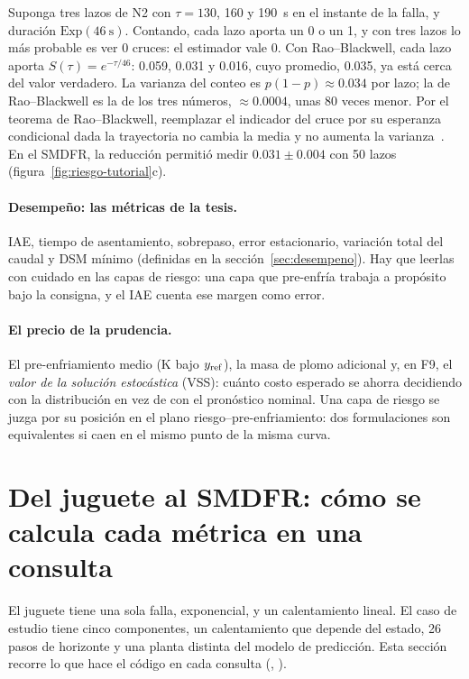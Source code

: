 \begin{ejemplo}\label{ej:rb}
Suponga tres lazos de N2 con $\tau=130$, 160 y 190~s en el instante de la falla, y duración
$\mathrm{Exp}(46~\text{s})$. Contando, cada lazo aporta un 0 o un 1, y con tres lazos lo más
probable es ver 0 cruces: el estimador vale 0. Con Rao--Blackwell, cada lazo aporta
$S(\tau)=e^{-\tau/46}$: 0.059, 0.031 y 0.016, cuyo promedio, 0.035, ya está cerca del valor
verdadero. La varianza del conteo es $p(1-p)\approx0.034$ por lazo; la de Rao--Blackwell es la
de los tres números, $\approx0.0004$, unas 80 veces menor. Por el teorema de Rao--Blackwell, reemplazar
el indicador del cruce por su esperanza condicional dada la trayectoria no cambia la media y no
aumenta la varianza~\cite{casella2002}. En el SMDFR, la reducción permitió medir
$0.031\pm0.004$ con 50 lazos (figura~\ref{fig:riesgo-tutorial}c).
\end{ejemplo}

\paragraph{Desempeño: las métricas de la tesis.} IAE, tiempo de asentamiento, sobrepaso,
error estacionario, variación total del caudal y DSM mínimo (definidas en la
sección~\ref{sec:desempeno}). Hay que leerlas con cuidado en las capas de riesgo: una capa que
pre-enfría trabaja a propósito bajo la consigna, y el IAE cuenta ese margen como error.

\paragraph{El precio de la prudencia.} El pre-enfriamiento medio (K bajo $y_{\rm ref}$), la masa
de plomo adicional y, en F9, el \emph{valor de la solución estocástica} (VSS): cuánto costo
esperado se ahorra decidiendo con la distribución en vez de con el pronóstico nominal. Una capa de
riesgo se juzga por su posición en el plano riesgo--pre-enfriamiento: dos formulaciones son
equivalentes si caen en el mismo punto de la misma curva.

\section{Del juguete al SMDFR: cómo se calcula cada métrica en una consulta}\label{sec:riesgo-calculo}
El juguete tiene una sola falla, exponencial, y un calentamiento lineal. El caso de estudio tiene
cinco componentes, un calentamiento que depende del estado, 26 pasos de horizonte y una planta
distinta del modelo de predicción. Esta sección recorre lo que hace el código en cada consulta
(, ).

